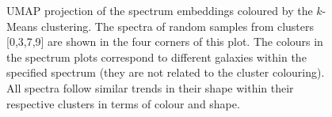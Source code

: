 \documentclass[draft, a4paper,12pt]{article}
\begin{document}
\begin{figure}[H]
    \centering
    \vspace{-1cm}
    \caption{UMAP projection of the spectrum embeddings coloured by the $k$-Means clustering. The spectra of random samples from clusters [0,3,7,9] are shown in the four corners of this plot. The colours in the spectrum plots correspond to different galaxies within the specified spectrum (they are not related to the cluster colouring). All spectra follow similar trends in their shape within their respective clusters in terms of colour and shape.}
    \label{fig:annotated_spectra}
\end{figure}
\end{document}
